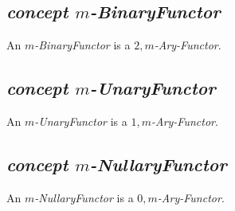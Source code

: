 \subsection{\textit{concept $m$-BinaryFunctor}}
An \textit{$m$-BinaryFunctor} is a \textit{$2,m$-Ary-Functor}.

\subsection{\textit{concept $m$-UnaryFunctor}}
An \textit{$m$-UnaryFunctor} is a \textit{$1,m$-Ary-Functor}.

\subsection{\textit{concept $m$-NullaryFunctor}}
An \textit{$m$-NullaryFunctor} is a \textit{$0,m$-Ary-Functor}.
